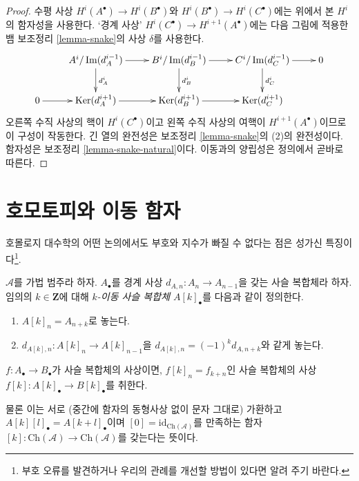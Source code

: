 \begin{proof}
수평 사상 $H^i(A^\bullet) \to H^i(B^\bullet)$와
$H^i(B^\bullet) \to H^i(C^\bullet)$에는 위에서 본 $H^i$의 함자성을
사용한다. ‘경계 사상’ $H^i(C^\bullet) \to H^{i + 1}(A^\bullet)$에는
다음 그림에 적용한 뱀 보조정리 \ref{lemma-snake}의 사상 $\delta$를
사용한다.
$$
\xymatrix{
&
A^i/\Im(d_A^{i - 1}) \ar[r] \ar[d]^{d_A^i} &
B^i/\Im(d_B^{i - 1}) \ar[r] \ar[d]^{d_B^i} &
C^i/\Im(d_C^{i - 1}) \ar[r] \ar[d]^{d_C^i} &
0 \\
0 \ar[r] &
\Ker(d_A^{i + 1}) \ar[r] &
\Ker(d_B^{i + 1}) \ar[r] &
\Ker(d_C^{i + 1}) &
}
$$
오른쪽 수직 사상의 핵이 $H^i(C^\bullet)$이고 왼쪽 수직 사상의
여핵이 $H^{i + 1}(A^\bullet)$이므로 이 구성이 작동한다.
긴 열의 완전성은 보조정리 \ref{lemma-snake}의 (2)의 완전성이다.
함자성은 보조정리 \ref{lemma-snake-natural}이다.
이동과의 양립성은 정의에서 곧바로 따른다.
\end{proof}








\section{호모토피와 이동 함자}
\label{section-homotopy-shift}

\noindent
호몰로지 대수학의 어떤 논의에서도 부호와 지수가 빠질 수 없다는 점은
성가신 특징이다\footnote{부호 오류를 발견하거나 우리의 관례를 개선할
방법이 있다면 알려 주기 바란다.}.

\begin{definition}
\label{definition-shift}
$\mathcal{A}$를 가법 범주라 하자.
$A_\bullet$를 경계 사상 $d_{A, n} : A_n \to A_{n - 1}$을 갖는 사슬
복합체라 하자. 임의의 $k \in \mathbf{Z}$에 대해
{\it $k$-이동 사슬 복합체 $A[k]_\bullet$}를 다음과 같이 정의한다.
\begin{enumerate}
\item $A[k]_n = A_{n + k}$로 놓는다.
\item $d_{A[k], n} : A[k]_n \to A[k]_{n - 1}$을
$d_{A[k], n} = (-1)^k d_{A, n + k}$와 같게 놓는다.
\end{enumerate}
$f : A_\bullet \to B_\bullet$가 사슬 복합체의 사상이면,
$f[k]_n = f_{k + n}$인 사슬 복합체의 사상
$f[k] : A[k]_\bullet \to B[k]_\bullet$를 취한다.
\end{definition}

\noindent
물론 이는 서로 (중간에 함자의 동형사상 없이 문자 그대로) 가환하고
$A[k][l]_\bullet = A[k + l]_\bullet$이며
$[0] = \text{id}_{\text{Ch}(\mathcal{A})}$를 만족하는 함자
$[k] : \text{Ch}(\mathcal{A}) \to \text{Ch}(\mathcal{A})$를
갖는다는 뜻이다.

